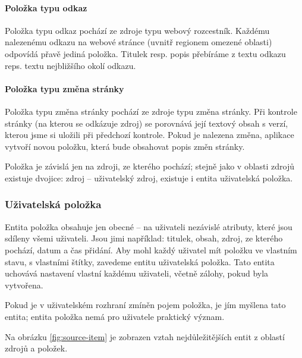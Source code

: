 \paragraph{Položka typu odkaz}

Položka typu odkaz pochází ze zdroje typu webový rozcestník.
Každému nalezenému odkazu na webové stránce (uvnitř regionem omezené oblasti) odpovídá přavě jediná položka.
Titulek resp. popis přebíráme z textu odkazu reps. textu nejbližšího okolí odkazu.

\paragraph{Položka typu změna stránky}

Položka typu změna stránky pochází ze zdroje typu změna stránky.
Při kontrole stránky (na kterou se odkázuje zdroj) se porovnává její textový obsah s verzí, kterou jsme si uložili při předchozí kontrole.
Pokud je nalezena změna, aplikace vytvoří novou položku, která bude obsahovat popis změn stránky.

\bigskip

Položka je závislá jen na zdroji, ze kterého pochází; stejně jako v oblasti zdrojů existuje dvojice: zdroj -- uživatelský zdroj, existuje i entita uživatelská položka.

\subsubsection{Uživatelská položka}

Entita položka obsahuje jen obecné -- na uživateli nezávislé atributy, které jsou sdíleny všemi uživateli.
Jsou jimi například: titulek, obsah, zdroj, ze kterého pochází, datum a čas přidání.
Aby mohl každý uživatel mít položku ve vlastním stavu, s vlastními štítky, zavedeme entitu uživatelská položka.
Tato entita uchovává nastavení vlastní každému uživateli, včetně zálohy, pokud byla vytvořena.

Pokud je v uživatelském rozhraní zmíněn pojem položka, je jím myšlena tato entita; entita položka nemá pro uživatele praktický význam.

\bigskip

Na obrázku \ref{fig:source-item} je zobrazen vztah nejdůležitějších entit z oblastí zdrojů a položek.

